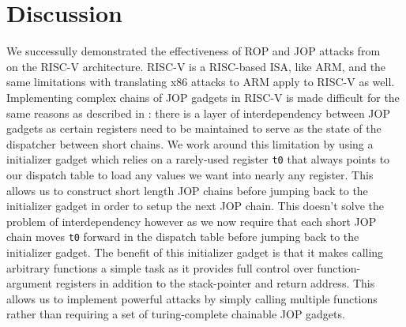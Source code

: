 \section{Discussion}

We successully demonstrated the effectiveness of ROP and JOP attacks from
~\cite{checkoway10ropnoret,bletsch11jopx86,sadeghi15tinyjop} on the RISC-V
architecture. RISC-V is a RISC-based ISA, like ARM, and the same limitations
with translating x86 attacks to ARM apply to RISC-V as well. Implementing
complex chains of JOP gadgets in RISC-V is made difficult for the same reasons
as described in \cite{bletsch11jopx86}: there is a layer of interdependency
between JOP gadgets as certain registers need to be maintained to serve as the
state of the dispatcher between short chains. We work around this limitation
by using a initializer gadget which relies on a rarely-used register \verb|t0|
that always points to our dispatch table to load any values we want into nearly
any register. This allows us to construct short length JOP chains before
jumping back to the initializer gadget in order to setup the next JOP chain.
This doesn't solve the problem of interdependency however as we now require
that each short JOP chain moves \verb|t0| forward in the dispatch table before
jumping back to the initializer gadget. The benefit of this initializer
gadget is that it makes calling arbitrary functions a simple task as it provides
full control over function-argument registers in addition to the stack-pointer and
return address. This allows us to implement powerful attacks by simply calling
multiple functions rather than requiring a set of turing-complete chainable JOP gadgets.

